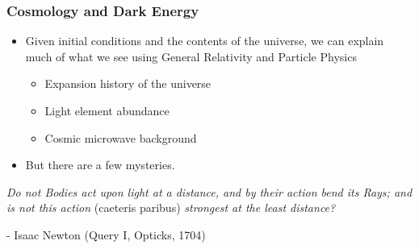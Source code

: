 \documentclass{beamer}
\begin{document}
\frame
{
    \frametitle{Cosmology and Dark Energy}


    \begin{itemize}

        \item Given initial conditions and the contents of the universe,
            we can explain much of what we see using General Relativity
            and Particle Physics

        \begin{itemize}
                
            \item Expansion history of the universe

            \item Light element abundance

            \item Cosmic microwave background

        \end{itemize}

    \item But there are a few mysteries.

    \end{itemize}
}



\frame
{

    {\Large 
        {\em Do not Bodies act upon light at a distance, and by their action bend its Rays;
        and is not this action } (caeteris paribus) {\em strongest at the least distance?}
        \newline

        \hfill - Isaac Newton (Query I, Opticks, 1704)
    }
}
\end{document}
